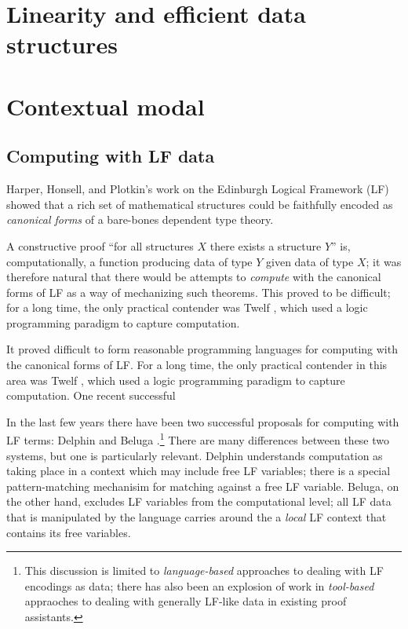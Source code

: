 \documentclass[twocolumn]{article}
\begin{document}
\section{Linearity and efficient data structures}

\section{Contextual modal}

\subsection{Computing with LF data}

Harper, Honsell, and Plotkin's work on the Edinburgh Logical Framework (LF)
\cite{harper93framework} showed that a rich set of mathematical structures
could be faithfully encoded as {\it canonical forms} of a bare-bones dependent
type theory. 

A constructive proof ``for all structures $X$ there exists a structure $Y$'' 
is, computationally, a function producing data of type $Y$ given data of
type $X$; it was therefore natural that there would be attempts to 
{\it compute} with the canonical forms of LF as a way of mechanizing
such theorems. This proved to be difficult; for a long time, the only 
practical contender was Twelf \cite{pfenning99system}, which used a logic 
programming paradigm to capture computation. 

It proved difficult to form reasonable programming 
languages for computing with the canonical forms of LF. 
For a long time, the only practical contender in this area
was Twelf \cite{pfenning99system}, which used a logic programming paradigm
to capture computation. One recent successful 

In the last few years there have been two 
successful proposals for computing with LF terms: 
Delphin \cite{poswolsky08functional} and 
Beluga \cite{pientka10beluga}.\footnote{This discussion is limited to 
{\it language-based} approaches to dealing with LF encodings as data; 
there has also been an explosion of work
in {\it tool-based} appraoches to dealing with generally LF-like data in 
existing proof assistants.} There are many differences between these 
two systems,
but one is particularly relevant. Delphin understands computation as taking
place in a context which may include free LF variables; there is a special
pattern-matching mechanisim for matching against a free LF variable. 
Beluga, on the other hand, excludes LF variables from the computational 
level; all LF data that is manipulated by the language carries around the
a {\it local} LF context that contains its free variables.





\end{document}
